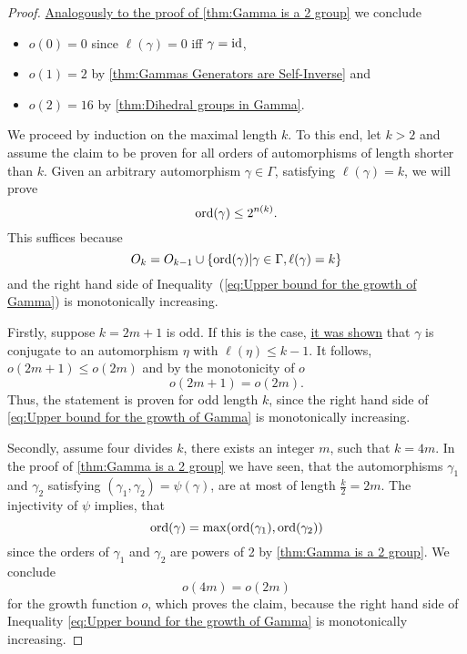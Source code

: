 \begin{proof}
\hyperlink{thm:Base Case}{Analogously to the proof of \cref*{thm:Gamma is a 2 group}} we conclude
\begin{itemize}
\item $o(0)=0$ since $\ell(\gamma)=0$ iff $\gamma=\operatorname{id}$,
\item $o(1)=2$ by \cref{thm:Gammas Generators are Self-Inverse} and
\item $o(2)=16$ by \cref{thm:Dihedral groups in Gamma}.
\end{itemize}
We proceed by induction on the maximal length $k$. To this end, let $k>2$ and assume the claim to be proven for all orders of automorphisms of length shorter than $k$. Given an arbitrary automorphism $\gamma\in\Gamma$, satisfying $\ell(\gamma)=k$, we will prove
\begin{equation*}
\operatorname{\mathrm{ord}}(\gamma)\leq 2^{n(k)}.
\end{equation*}
This suffices because
\begin{equation*}
O_k=O_{k-1}\cup \lbrace\operatorname{\mathrm{ord}}(\gamma)\vert \gamma\in\Gamma,\ell(\gamma)=k\rbrace
\end{equation*} 
and the right hand side of Inequality~(\ref{eq:Upper bound for the growth of Gamma}) is monotonically increasing.

Firstly, suppose $k=2m+1$ is odd. If this is the case, \hyperlink{thm:k is odd}{it was shown} that $\gamma$ is conjugate to an automorphism $\eta$ with $\ell(\eta)\leq k-1$. It follows, $o(2m+1)\leq o(2m)$ and by the monotonicity of $o$
\begin{equation}\label{eq:o(2m+1)=o(2m)}
o(2m+1)=o(2m).
\end{equation}
Thus, the statement is proven for odd length $k$, since the right hand side of \cref{eq:Upper bound for the growth of Gamma} is monotonically increasing.

Secondly, assume four divides $k$, \ie there exists an integer $m$, such that $k=4m$. In the proof of \cref{thm:Gamma is a 2 group} we have seen, that the automorphisms $\gamma_1$ and $\gamma_2$ satisfying $(\gamma_1,\gamma_2)=\psi(\gamma)$, are at most of length $\frac{k}{2}=2m$. The injectivity of $\psi$ implies, that
\begin{equation*}
\operatorname{\mathrm{ord}}(\gamma)=\max(\operatorname{\mathrm{ord}}(\gamma_1),\operatorname{\mathrm{ord}}(\gamma_2))
\end{equation*}
since the orders of $\gamma_1$ and $\gamma_2$ are powers of 2 by \cref{thm:Gamma is a 2 group}. We conclude
\begin{equation}
o(4m)=o(2m)\label{eq:o(4m)=o(2m)}
\end{equation}
for the growth function $o$, which proves the claim, because the right hand side of Inequality \ref{eq:Upper bound for the growth of Gamma} is monotonically increasing.


\end{proof}
